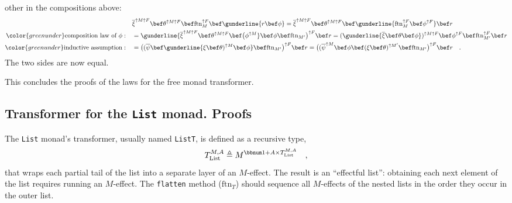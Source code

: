other in the compositions above:
\begin{align*}
 & \overline{\xi}^{\uparrow M\uparrow F}\bef\theta^{\uparrow M\uparrow F}\bef\text{ftn}_{M}^{\uparrow F}\bef\gunderline{r\bef\phi}=\overline{\xi}^{\uparrow M\uparrow F}\bef\theta^{\uparrow M\uparrow F}\bef\gunderline{\text{ftn}_{M}^{\uparrow F}\bef\phi^{\uparrow F}}\bef r\\
{\color{greenunder}\text{composition law of }\phi:}\quad & =\gunderline{\overline{\xi}^{\uparrow M\uparrow F}\bef\theta^{\uparrow M\uparrow F}\bef\big(\phi^{\uparrow M}}\bef\phi\bef\text{ftn}_{M^{\prime}}\big)^{\uparrow F}\bef r=(\gunderline{\overline{\xi}\bef\theta\bef\phi})^{\uparrow M\uparrow F}\bef\phi^{\uparrow F}\bef\text{ftn}_{M^{\prime}}^{\uparrow F}\bef r\\
{\color{greenunder}\text{inductive assumption}:}\quad & =\big((\overline{\psi}\bef\gunderline{\xi\bef\theta)^{\uparrow M}\bef\phi}\bef\text{ftn}_{M^{\prime}}\big)^{\uparrow F}\bef r=\big((\overline{\psi}^{\uparrow M}\bef\phi\bef(\xi\bef\theta)^{\uparrow M^{\prime}}\bef\text{ftn}_{M^{\prime}}\big)^{\uparrow F}\bef r\quad.
\end{align*}
The two sides are now equal.

This concludes the proofs of the laws for the free monad transformer.

\subsection{Transformer for the \texttt{List} monad. Proofs}

The \lstinline!List! monad\textsf{'}s transformer, usually named \lstinline!ListT!,
is defined as a recursive type,
\[
T_{\text{List}}^{M,A}\triangleq M^{\bbnum 1+A\times T_{\text{List}}^{M,A}}\quad,
\]
that wraps each partial tail of the list into a separate layer of
an $M$-effect. The result is an \textsf{``}effectful list\textsf{''}: obtaining each
next element of the list requires running an $M$-effect. The \lstinline!flatten!
method ($\text{ftn}_{T}$) should sequence all $M$-effects of the
nested lists in the order they occur in the outer list.

